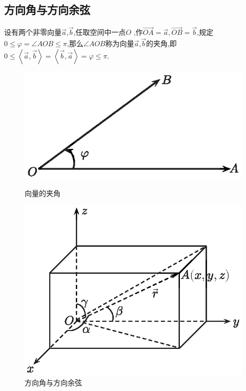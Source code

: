 \subsection{方向角与方向余弦}
\tdefination[向量的夹角]
设有两个非零向量$\overrightarrow{a}$,$\overrightarrow{b}$,任取空间中一点$O$ ,作$\overrightarrow{OA}=\overrightarrow{a},\overrightarrow{OB}=\overrightarrow{b}$,规定$0\le \varphi=\angle AOB\le \pi $,那么$\angle AOB$称为向量$\overrightarrow{a}$,$\overrightarrow{b}$的夹角,即$0\le\left\langle \overrightarrow{a},\overrightarrow{b}\right\rangle =\left\langle \overrightarrow{b},\overrightarrow{a}\right\rangle =\varphi\le \pi $.

\begin{figure}[h]
	\begin{minipage}{0.5\linewidth}
		\centering 
		\includegraphics[width=0.9\linewidth]{picture/C-1/1.1/angle.eps}
		\caption{向量的夹角}
	\end{minipage}
	\hfill
	\begin{minipage}{0.5\linewidth}
		\centering 
		\includegraphics[width=0.9\linewidth]{picture/C-1/1.1/angle2.eps}
		\caption{方向角与方向余弦}
	\end{minipage}
\end{figure}

